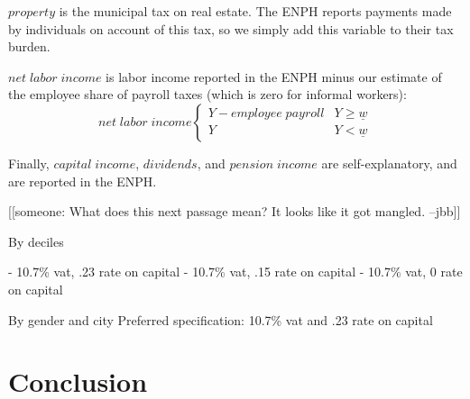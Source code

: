 \documentclass[12pt]{article}
\begin{document}
$property$ is the municipal tax on real estate.
The ENPH reports payments made by individuals on account of this tax,
so we simply add this variable to their tax burden.

$net \; labor \;income$ is labor income reported in the ENPH
minus our estimate of the employee share of payroll taxes
(which is zero for informal workers):
\begin{equation}
net \; labor \;income
  \begin{cases}
	Y - employee \; payroll& Y \geq \underline{w} \\
	Y &  Y < \underline{w}
  \end{cases}
\end{equation}

Finally, $capital \; income$, $dividends$, and $pension \; income$
are self-explanatory, and are reported in the ENPH.


[[someone:
    What does this next passage mean?
    It looks like it got mangled.
    --jbb]]

By deciles

- 10.7\% vat, .23 rate on capital
- 10.7\% vat, .15 rate on capital
- 10.7\% vat,  0 rate on capital

By gender and city
Preferred specification: 10.7\% vat and .23 rate on capital

\section{Conclusion}



\citet{microsim}
\end{document}

